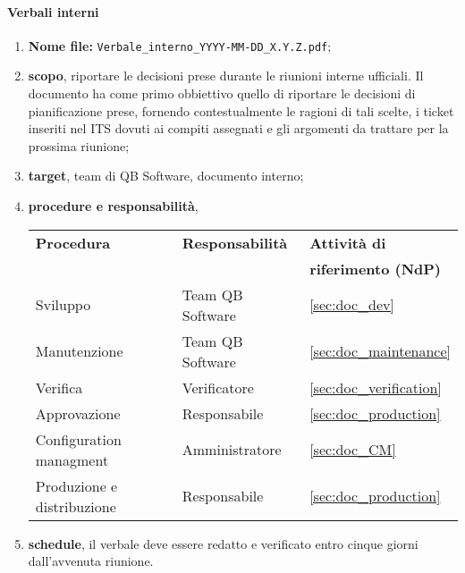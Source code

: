         \paragraph{Verbali interni}
            \begin{enumerate}
                \item \textbf{Nome file:} \texttt{Verbale\_interno\_YYYY-MM-DD\_X.Y.Z.pdf};
                \item \textbf{scopo}, riportare le decisioni prese durante le riunioni interne ufficiali. Il documento ha come primo obbiettivo quello di riportare le decisioni di pianificazione prese, fornendo contestualmente le ragioni di tali scelte, i ticket inseriti nel ITS dovuti ai compiti assegnati e gli argomenti da trattare per la prossima riunione;
                \item \textbf{target}, team di QB Software, documento interno;
                \item \textbf{procedure e responsabilità},
                \\
                \begin{tabularx}{0.93\textwidth}{|X|X|X|}
                    \hline
                    \textbf{Procedura} & \textbf{Responsabilità} & \textbf{Attività di} \\
                    & & \textbf{riferimento (NdP)} \\
                    \hline
                    Sviluppo & Team QB Software &  \ref{sec:doc_dev}
                    \\\hline
                    Manutenzione & Team QB Software & \ref{sec:doc_maintenance}
                    \\\hline
                    Verifica & Verificatore & \ref{sec:doc_verification}
                    \\\hline
                    Approvazione & Responsabile & \ref{sec:doc_production}
                    \\\hline
                    Configuration managment & Amministratore & \ref{sec:doc_CM}
                    \\\hline
                    Produzione e distribuzione & Responsabile & \ref{sec:doc_production}
                    \\\hline
                \end{tabularx}
                \item \textbf{schedule}, il verbale deve essere redatto e verificato entro cinque giorni dall'avvenuta riunione.
            \end{enumerate} 

